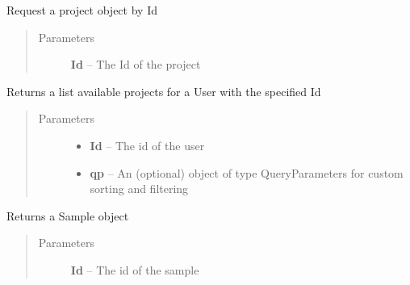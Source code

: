 \documentclass[letterpaper,10pt,english]{sphinxmanual}
\begin{document}
\begin{fulllineitems}
\begin{fulllineitems}
\end{fulllineitems}


\begin{fulllineitems}
\label{Available modules:BaseSpacePy.api.BaseSpaceAPI.BaseSpaceAPI.getProjectById}
Request a project object by Id
\begin{quote}\begin{description}
\item[{Parameters}] \leavevmode
\textbf{Id} -- The Id of the project

\end{description}\end{quote}

\end{fulllineitems}


\begin{fulllineitems}
\label{Available modules:BaseSpacePy.api.BaseSpaceAPI.BaseSpaceAPI.getProjectByUser}
Returns a list available projects for a User with the specified Id
\begin{quote}\begin{description}
\item[{Parameters}] \leavevmode\begin{itemize}
\item {} 
\textbf{Id} -- The id of the user

\item {} 
\textbf{qp} -- An (optional) object of type QueryParameters for custom sorting and filtering

\end{itemize}

\end{description}\end{quote}

\end{fulllineitems}


\begin{fulllineitems}
\label{Available modules:BaseSpacePy.api.BaseSpaceAPI.BaseSpaceAPI.getSampleById}
Returns a Sample object
\begin{quote}\begin{description}
\item[{Parameters}] \leavevmode
\textbf{Id} -- The id of the sample


\end{description}
\end{quote}
\end{fulllineitems}
\end{fulllineitems}
\end{document}
